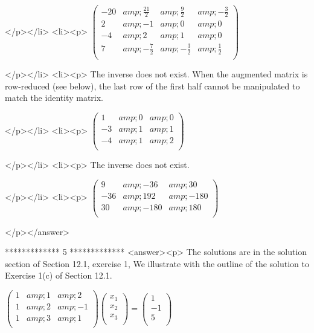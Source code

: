 </p></li>
<li><p>   \(\left(
\begin{array}{cccc}
 -20 &amp; \frac{21}{2} &amp; \frac{9}{2} &amp; -\frac{3}{2} \\
 2 &amp; -1 &amp; 0 &amp; 0 \\
 -4 &amp; 2 &amp; 1 &amp; 0 \\
 7 &amp; -\frac{7}{2} &amp; -\frac{3}{2} &amp; \frac{1}{2} \\
\end{array}
\right)\)

</p></li>
<li><p>   The inverse does not exist.   When the augmented matrix is row-reduced (see below), the last row of the first half cannot be manipulated
to match the identity matrix. 

</p></li>
<li><p>    \(\left(
\begin{array}{ccc}
 1 &amp; 0 &amp; 0 \\
 -3 &amp; 1 &amp; 1 \\
 -4 &amp; 1 &amp; 2 \\
\end{array}
\right)\)

</p></li>
<li><p>    The inverse does not exist.   

</p></li>
<li><p>     \(\left(
\begin{array}{ccc}
 9 &amp; -36 &amp; 30 \\
 -36 &amp; 192 &amp; -180 \\
 30 &amp; -180 &amp; 180 \\
\end{array}
\right)\)

</p></answer>


*************
5
*************
<answer><p> The solutions are in the solution section of Section 12.1, exercise 1, We illustrate with the outline of the solution to Exercise 1(c) of Section
12.1.



\(\left(
\begin{array}{ccc}
 1 &amp; 1 &amp; 2 \\
 1 &amp; 2 &amp; -1 \\
 1 &amp; 3 &amp; 1 \\
\end{array}
\right)\left(
\begin{array}{c}
 x_1 \\
 x_2 \\
 x_3 \\
\end{array}
\right)=\left(
\begin{array}{c}
 1 \\
 -1 \\
 5 \\
\end{array}
\right)\)



